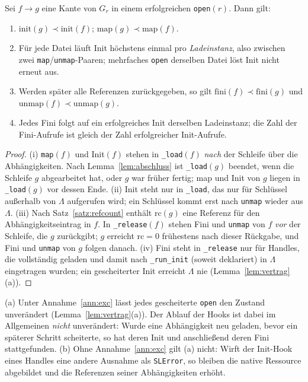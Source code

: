 \begin{satz}
	\label{satz:reihenfolge}
	Sei $f\to g$ eine Kante von $G_r$ in einem erfolgreichen \texttt{open}$(r)$. Dann gilt:
	\begin{enumerate}[label=(\roman*)]
		\item $\mathrm{init}(g)\prec\mathrm{init}(f)$; $\mathrm{map}(g)\prec\mathrm{map}(f)$.
		\item Für jede Datei läuft Init höchstens einmal pro \emph{Ladeinstanz}, also zwischen zwei \texttt{map}/\texttt{unmap}-Paaren; mehrfaches \texttt{open} derselben Datei löst Init nicht erneut aus.
		\item Werden später alle Referenzen zurückgegeben, so gilt $\mathrm{fini}(f)\prec\mathrm{fini}(g)$ und $\mathrm{unmap}(f)\prec\mathrm{unmap}(g)$.
		\item Jedes Fini folgt auf ein erfolgreiches Init derselben Ladeinstanz; die Zahl der Fini-Aufrufe ist gleich der Zahl erfolgreicher Init-Aufrufe.
	\end{enumerate}
\end{satz}

\begin{proof}
	(i) \texttt{map}$(f)$ und Init$(f)$ stehen in \texttt{\_load}$(f)$ \emph{nach} der Schleife über die Abhängigkeiten. Nach Lemma~\ref{lem:abschluss} ist \texttt{\_load}$(g)$ beendet, wenn die Schleife $g$ abgearbeitet hat, oder $g$ war früher fertig; map und Init von $g$ liegen in \texttt{\_load}$(g)$ vor dessen Ende. (ii) Init steht nur in \texttt{\_load}, das nur für Schlüssel außerhalb von $\Lambda$ aufgerufen wird; ein Schlüssel kommt erst nach \texttt{unmap} wieder aus $\Lambda$. (iii) Nach Satz~\ref{satz:refcount} enthält $\mathrm{rc}(g)$ eine Referenz für den Abhängigkeitseintrag in $f$. In \texttt{\_release}$(f)$ stehen Fini und \texttt{unmap} von $f$ \emph{vor} der Schleife, die $g$ zurückgibt; $g$ erreicht $\mathrm{rc}=0$ frühestens nach dieser Rückgabe, und Fini und \texttt{unmap} von $g$ folgen danach. (iv) Fini steht in \texttt{\_release} nur für Handles, die vollständig geladen und damit nach \texttt{\_run\_init} (soweit deklariert) in $\Lambda$ eingetragen wurden; ein gescheiterter Init erreicht $\Lambda$ nie (Lemma~\ref{lem:vertrag}(a)).
\end{proof}

\begin{satz}
	\label{satz:ausnahme}
	(a) Unter Annahme~\ref{ann:exc} lässt jedes gescheiterte \texttt{open} den Zustand unverändert (Lemma~\ref{lem:vertrag}(a)). Der Ablauf der Hooks ist dabei im Allgemeinen \emph{nicht} unverändert: Wurde eine Abhängigkeit neu geladen, bevor ein späterer Schritt scheiterte, so hat deren Init und anschließend deren Fini stattgefunden. (b) Ohne Annahme~\ref{ann:exc} gilt (a) nicht: Wirft der Init-Hook eines Handles eine andere Ausnahme als \texttt{SLError}, so bleiben die native Ressource abgebildet und die Referenzen seiner Abhängigkeiten erhöht.
\end{satz}


